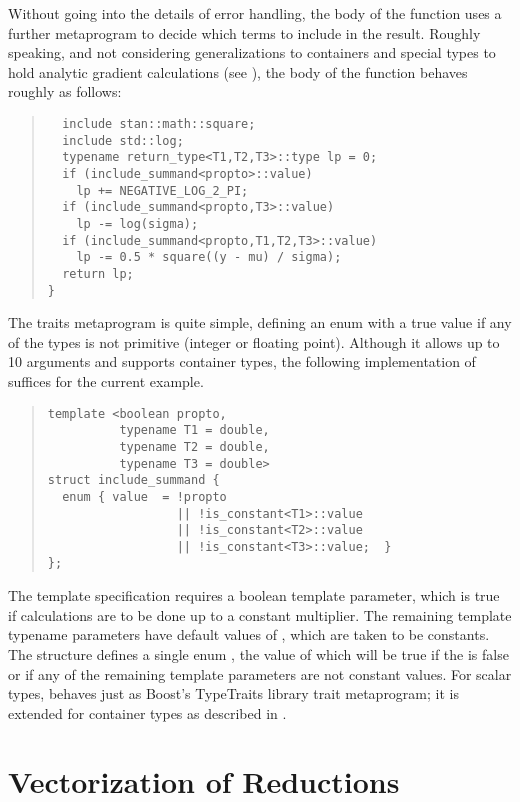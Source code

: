 \documentclass[10pt]{article}
\begin{document}
Without going into the details of error handling, the body of the
function uses a further metaprogram to decide which terms to include
in the result.  Roughly speaking, and not considering generalizations
to containers and special  types to hold analytic gradient
calculations (see ), the body of the
function behaves roughly as follows:
%
\begin{quote}
\begin{Verbatim}
  include stan::math::square;
  include std::log;
  typename return_type<T1,T2,T3>::type lp = 0;
  if (include_summand<propto>::value)
    lp += NEGATIVE_LOG_2_PI;
  if (include_summand<propto,T3>::value)
    lp -= log(sigma);
  if (include_summand<propto,T1,T2,T3>::value)
    lp -= 0.5 * square((y - mu) / sigma);
  return lp;
}
\end{Verbatim}
\end{quote}
%
The  traits metaprogram is quite simple,
defining an enum with a true value if any of the types is not
primitive (integer or floating point).  Although it allows up to 10
arguments and supports container types, the following implementation
of  suffices for the current example.
%
\begin{quote}
\begin{Verbatim}
template <boolean propto,
          typename T1 = double, 
          typename T2 = double, 
          typename T3 = double>
struct include_summand {
  enum { value  = !propto  
                  || !is_constant<T1>::value
                  || !is_constant<T2>::value
                  || !is_constant<T3>::value;  }
};
\end{Verbatim}
\end{quote}
%
The template specification requires a boolean  template
parameter, which is true if calculations are to be done up to a
constant multiplier.  The remaining template typename parameters have
default values of , which are taken to be constants.  The
structure defines a single enum , the value of which will
be true if the  is false or if any of the remaining
template parameters are not constant values.  For scalar types,
 behaves just as Boost's TypeTraits library
 trait metaprogram; it is extended for container
types as described in .


\section{Vectorization of Reductions}\label{vectorization.section}
\end{document}
